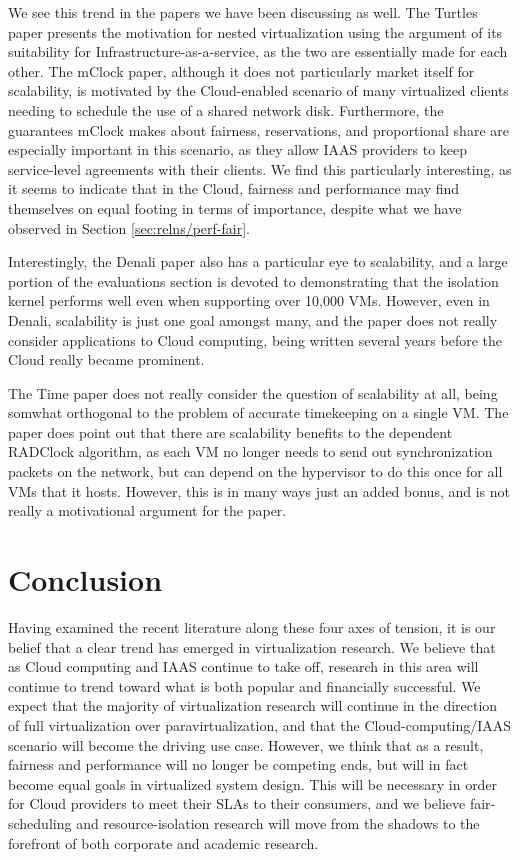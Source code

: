 \documentclass[letterpaper, twocolumn]{article}
\begin{document}
We see this trend in the papers we have been discussing as well.  The Turtles paper presents
the motivation for nested virtualization using the argument of its suitability for
Infrastructure-as-a-service, as the two are essentially made for each other.  The mClock paper,
although it does not particularly market itself
for scalability, is motivated by the Cloud-enabled scenario of many virtualized clients
needing to schedule the use of a shared network disk.  Furthermore, the guarantees mClock
makes about fairness, reservations, and proportional share are especially important
in this scenario, as they allow IAAS providers to keep service-level agreements with
their clients.  We find this particularly interesting, as it seems to indicate
that in the Cloud, fairness and performance may find themselves on equal footing in
terms of importance, despite what we have observed in Section \ref{sec:relns/perf-fair}.

Interestingly, the Denali paper also has a particular eye to scalability, and a large
portion of the evaluations section is devoted to demonstrating that the isolation kernel
performs well even when supporting over 10,000 VMs.  However, even in Denali, scalability
is just one goal amongst many, and the paper does not really consider applications
to Cloud computing, being written several years before the Cloud really became prominent.

The Time paper does not really consider the question of scalability at all, being
somwhat orthogonal to the problem of accurate timekeeping on a single VM.  The paper
does point out that there are scalability benefits to the dependent RADClock algorithm,
as each VM no longer needs to send out synchronization packets on the network, but can
depend on the hypervisor to do this once for all VMs that it hosts.  However, this is 
in many ways just an added bonus, and is not really a motivational argument for the paper.

\section{Conclusion}
\label{sec:conclusion}

Having examined the recent literature along these four axes of tension, it is our belief
that a clear trend has emerged in virtualization research.  We believe that as Cloud computing and
IAAS continue to take off, research in this area will continue to trend toward what
is both popular and financially successful.  We expect that the majority of virtualization
research will continue in the direction of full virtualization over paravirtualization,
and that the Cloud-computing/IAAS scenario will become the driving use case.
However, we think that as a result, fairness and performance will no longer be
competing ends, but will in fact become equal goals in virtualized system design.
This will be necessary in order for Cloud providers to meet their SLAs to their
consumers, and we believe fair-scheduling and resource-isolation research will move
from the shadows to the forefront of both corporate and academic research.
\end{document}
